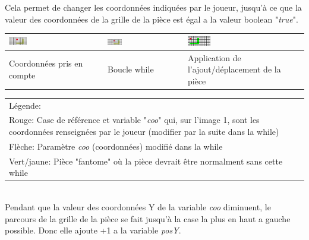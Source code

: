         Cela permet de changer les coordonnées indiquées par le joueur, jusqu'à ce que la valeur des coordonnées de la grille de la pièce est égal a la valeur boolean "\textit{true}".

        \begin{center}
            \begin{tabular}{|m{4.5cm}|m{4.5cm}|m{4.5cm}|}
                \hline
                \includegraphics[width=0.20\textwidth, keepaspectratio]{img/pieceLCliqueFantome.png} & \includegraphics[width=0.20\textwidth, keepaspectratio]{img/pieceLCliqueFantome-1.png} & \includegraphics[width=0.20\textwidth, keepaspectratio]{img/pieceLCliqueMis.png}\\
                \hline
                {\small Coordonnées pris en compte} & {\small Boucle while} & {\small Application de l'ajout/déplacement de la pièce}\\
                \hline
            \end{tabular}
        \end{center}

            \begin{tabular}{|m{13.5cm}|}
                \hline
                {\small Légende:}\\
                {\small Rouge: Case de référence et variable "\textit{coo}" qui, sur l'image 1, sont les coordonnées renseignées par le joueur (modifier par la suite dans la while)}\\
                {\small Flèche: Paramètre \textit{coo} (coordonnées) modifié dans la while}\\
                {\small Vert/jaune: Pièce "fantome" où la pièce devrait être normalment sans cette while}\\
                \hline
            \end{tabular}
            \\
            Pendant que la valeur des coordonnées Y de la variable \textit{coo} diminuent, le parcours de la grille de la pièce se fait jusqu'à la case la plus en haut a gauche possible. Donc elle ajoute +1 a la variable \textit{posY}.\\
                \\

